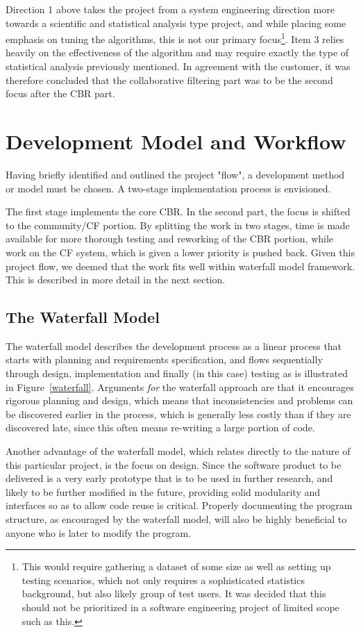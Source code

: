 Direction 1 above takes the project from a system engineering direction more towards a scientific and statistical analysis type project, and while placing some emphasis on tuning the algorithms, this is not our primary focus\footnote{This would require gathering a dataset of some size as well as setting up testing scenarios, which not only requires a sophisticated statistics background, but also likely group of test users. It was decided that this should not be prioritized in a software engineering project of limited scope such as this.}. Item 3 relies heavily on the effectiveness of the algorithm and may require exactly the type of statistical analysis previously mentioned. In agreement with the customer, it was therefore concluded that the collaborative filtering part was to be the second focus after the CBR part. 

\section{Development Model and Workflow}
Having briefly identified and outlined the project "flow", a development method or model must be chosen. A two-stage implementation process is envisioned.

The first stage implements the core CBR.  In the second part, the focus is shifted to the community/CF portion. By splitting the work in two stages, time is made available for more thorough testing and reworking of the CBR portion, while work on the CF system, which is given a lower priority is pushed back. Given this project flow, we deemed that the work fits well within waterfall model framework. This is described in more detail in the next section. 


\subsection{The Waterfall Model}
The waterfall model describes the development process as a linear process that starts with planning and requirements specification, and flows sequentially through design, implementation and finally (in this case) testing as is illustrated in Figure~\ref{waterfall}. Arguments \emph{for} the waterfall approach are that it encourages rigorous planning and design, which means that inconsistencies and problems can be discovered earlier in the process, which is generally less costly than if they are discovered late, since this often means re-writing a large portion of code. 

Another advantage of the waterfall model, which relates directly to the nature of this particular project, is the focus on design. Since the software product to be delivered is a very early prototype that is to be used in further research, and likely to be further modified in the future, providing solid modularity and interfaces so as to allow code reuse is critical. Properly documenting the program structure, as encouraged by the waterfall model, will also be highly beneficial to anyone who is later to modify the program.

